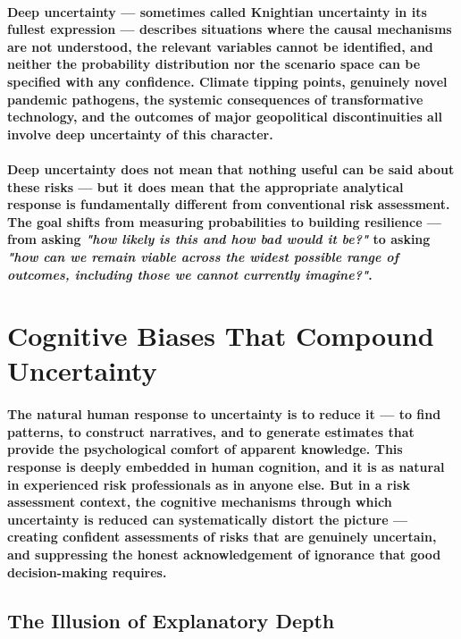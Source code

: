 \paragraph{\textbf{Deep uncertainty} — sometimes called Knightian uncertainty in its fullest expression — describes situations where the causal mechanisms are not understood, the relevant variables cannot be identified, and neither the probability distribution nor the scenario space can be specified with any confidence. Climate tipping points, genuinely novel pandemic pathogens, the systemic consequences of transformative technology, and the outcomes of major geopolitical discontinuities all involve deep uncertainty of this character.}
\paragraph{Deep uncertainty does not mean that nothing useful can be said about these risks — but it does mean that the appropriate analytical response is fundamentally different from conventional risk assessment. The goal shifts from measuring probabilities to building resilience — from asking \textit{"how likely is this and how bad would it be?"} to asking \textit{"how can we remain viable across the widest possible range of outcomes, including those we cannot currently imagine?"}.}

\section{Cognitive Biases That Compound Uncertainty}
\paragraph{The natural human response to uncertainty is to reduce it — to find patterns, to construct narratives, and to generate estimates that provide the psychological comfort of apparent knowledge. This response is deeply embedded in human cognition, and it is as natural in experienced risk professionals as in anyone else. But in a risk assessment context, the cognitive mechanisms through which uncertainty is reduced can systematically distort the picture — creating confident assessments of risks that are genuinely uncertain, and suppressing the honest acknowledgement of ignorance that good decision-making requires.}

\subsection{The Illusion of Explanatory Depth}
